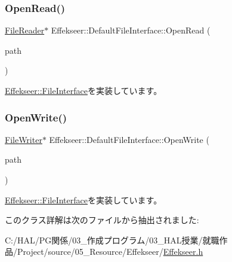 \subsubsection{\texorpdfstring{Open\+Read()}{OpenRead()}}
{\footnotesize\ttfamily \mbox{\hyperlink{class_effekseer_1_1_file_reader}{File\+Reader}}$\ast$ Effekseer\+::\+Default\+File\+Interface\+::\+Open\+Read (\begin{DoxyParamCaption}\item[{const \mbox{\hyperlink{_effekseer_8h_a50b026abea014b47854bcd835b3b6233}{E\+F\+K\+\_\+\+C\+H\+AR}} $\ast$}]{path }\end{DoxyParamCaption})\hspace{0.3cm}{\ttfamily [virtual]}}



\mbox{\hyperlink{class_effekseer_1_1_file_interface_ad8744ad57226d9a2ce74f6ef6e2f9a41}{Effekseer\+::\+File\+Interface}}を実装しています。

\mbox{\label{class_effekseer_1_1_default_file_interface_aecbcd4350ca701360dcea88a2c5f9c64}} 
\subsubsection{\texorpdfstring{Open\+Write()}{OpenWrite()}}
{\footnotesize\ttfamily \mbox{\hyperlink{class_effekseer_1_1_file_writer}{File\+Writer}}$\ast$ Effekseer\+::\+Default\+File\+Interface\+::\+Open\+Write (\begin{DoxyParamCaption}\item[{const \mbox{\hyperlink{_effekseer_8h_a50b026abea014b47854bcd835b3b6233}{E\+F\+K\+\_\+\+C\+H\+AR}} $\ast$}]{path }\end{DoxyParamCaption})\hspace{0.3cm}{\ttfamily [virtual]}}



\mbox{\hyperlink{class_effekseer_1_1_file_interface_a1e60cb81a5cae39b37e44570ef693d91}{Effekseer\+::\+File\+Interface}}を実装しています。



このクラス詳解は次のファイルから抽出されました\+:\begin{DoxyCompactItemize}
\item 
C\+:/\+H\+A\+L/\+P\+G関係/03\+\_\+作成プログラム/03\+\_\+\+H\+A\+L授業/就職作品/\+Project/source/05\+\_\+\+Resource/\+Effekseer/\mbox{\hyperlink{_effekseer_8h}{Effekseer.\+h}}\end{DoxyCompactItemize}
